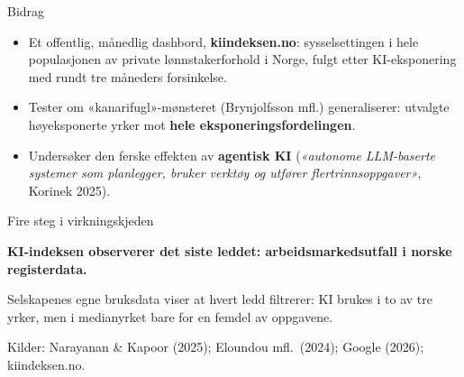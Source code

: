 \begin{frame}{Bidrag}
\begin{itemize}\setlength{\itemsep}{8pt}
  \item Et offentlig, månedlig dashbord, \textbf{kiindeksen.no}: sysselsettingen i hele populasjonen av private lønnstakerforhold i Norge, fulgt etter KI-eksponering med rundt tre måneders forsinkelse.
  \item Tester om «kanarifugl»-mønsteret (Brynjolfsson mfl.) generaliserer: utvalgte høyeksponerte yrker mot \textbf{hele eksponeringsfordelingen}.
  \item Undersøker den ferske effekten av \textbf{agentisk KI} (\emph{«autonome LLM-baserte systemer som planlegger, bruker verktøy og utfører flertrinnsoppgaver»}, Korinek 2025).
\end{itemize}
\end{frame}

\begin{frame}{Fire steg i virkningskjeden}
\vspace{0.4em}
\centering
{}

\vspace{0.8em}
\centering
\textcolor{illInk}{\textbf{KI-indeksen observerer det siste leddet: arbeidsmarkedsutfall i norske registerdata.}}

\vspace{0.4em}
\footnotesize\textcolor{illGray}{Selskapenes egne bruksdata viser at hvert ledd filtrerer: KI brukes i to av tre yrker, men i medianyrket bare for en femdel av oppgavene.}

\vspace{0.4em}
\raggedright\tiny\textcolor{illGray}{Kilder: Narayanan \& Kapoor (2025); Eloundou mfl.\ (2024); Google (2026); kiindeksen.no.}
\end{frame}
